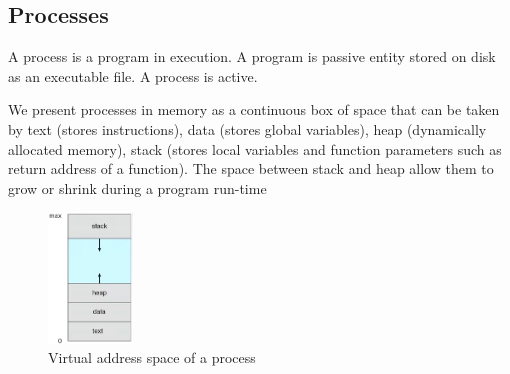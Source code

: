 \documentclass[a4paper]{article}
\theoremstyle{plain}
\theoremstyle{definition}
\newtheorem{defn}{Definition}[section]
\newtheorem{exmp}{Example}[section]
\theoremstyle{remark}
\begin{document}
\subsection{Processes}
\begin{tcolorbox}[colback=black!3!white,colframe=black!60!white,title=\begin{defn}Process \label{Process}\end{defn}]
A process is a program in execution. A program is passive entity stored on disk as an executable file. A process is active.
\end{tcolorbox}
\begin{tcolorbox}[colback=black!3!white,colframe=black!60!white,title=\begin{exmp}Process in memory \label{Process in memory}\end{exmp}]
We present processes in memory as a continuous box of space that can be taken by text (stores instructions), data (stores global variables), heap (dynamically allocated memory), stack (stores local variables and function parameters such as return address of a function). The space between stack and heap allow them to grow or shrink during a program run-time
        \begin{figure}[H]
        	\centering
        	\includegraphics[width=0.2\textwidth]{five.png}
        	\caption{Virtual address space of a process}
        	\label{fig:five-png}
        \end{figure}
\end{tcolorbox}
\end{document}
